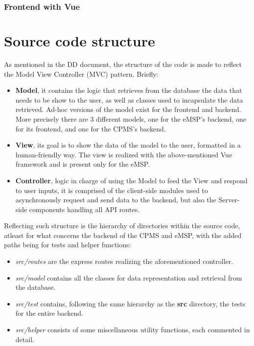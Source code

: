 \documentclass[11pt]{article}
\begin{document}
\subsubsection{Frontend with Vue}


\section{Source code structure}

As mentioned in the DD document, the structure of the code is made to reflect the Model View Controller (MVC) pattern. Briefly: \\
\begin{itemize}
    \item \textbf{Model}, it contains the logic that retrieves from the database the data that needs to be show to the user, as well as classes used to incapsulate the data retrieved. Ad-hoc versions of the model exist for the frontend and backend. \\
    More precisely there are 3 different models, one for the eMSP's backend, one for its frontend, and one for the CPMS's backend.
    \item \textbf{View}, its goal is to show the data of the model to the user, formatted in a human-friendly way. The view is realized with the above-mentioned Vue framework and is present only for the eMSP.
    \item \textbf{Controller}, logic in charge of using the Model to feed the View and respond to user inputs, it is comprised of the client-side modules used to asynchronously request and send data to the backend, but also the Server-side components handling all API routes.
\end{itemize}

Reflecting such structure is the hierarchy of directories within the source code, atleast for what concerns the backend of the CPMS and eMSP, with the added paths being for tests and helper functions:
\begin{itemize}
    \item \textit{src/routes} are the express routes realizing the aforementioned controller.
    \item \textit{src/model} contains all the classes for data representation and retrieval from the database.
    \item \textit{src/test} contains, following the same hierarchy as the \textbf{src} directory, the tests for the entire backend.
    \item \textit{src/helper} consists of some miscellaneous utility functions, each commented in detail.
\end{itemize}
\end{document}
